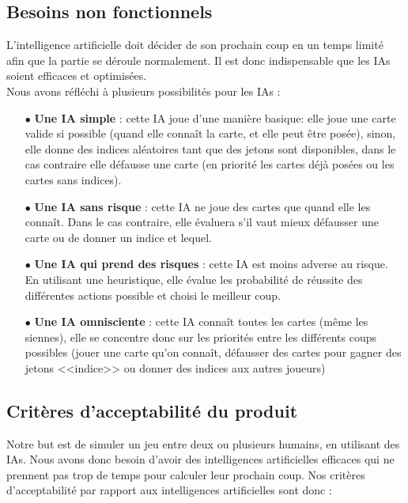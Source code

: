 \documentclass[11pt, letterpaper]{article}
\begin{document}
\subsection{Besoins non fonctionnels}

\noindent
L'intelligence artificielle doit décider de son prochain coup en un temps limité afin que la partie se déroule normalement. Il est donc indispensable que les IAs soient efficaces et optimisées. \\

\noindent
Nous avons réfléchi à plusieurs possibilités pour les IAs :\\

\begin{itemize}
    \item[$\bullet$] {\bfseries Une IA simple} : cette IA joue d'une manière basique: elle joue une carte valide si possible (quand elle connaît la carte, et elle peut être posée), sinon, elle donne des indices aléatoires tant que des jetons sont disponibles, dans le cas contraire elle défausse une carte (en priorité les cartes déjà posées ou les cartes sans indices).\\
    \item[$\bullet$] {\bfseries Une IA sans risque} : cette IA ne joue des cartes que quand elle les connaît. Dans le cas contraire, elle évaluera s'il vaut mieux défausser une carte ou de donner un indice et lequel.\\
    \item[$\bullet$] {\bfseries Une IA qui prend des risques} : cette IA est moins adverse au risque. En utilisant une heuristique, elle évalue les probabilité de réussite des différentes actions possible et choisi le meilleur coup. \\
    \item[$\bullet$] {\bfseries Une IA omnisciente} : cette IA connaît toutes les cartes (même les siennes), elle se concentre donc sur les priorités entre les différents coups possibles (jouer une carte qu'on connaît, défausser des cartes pour gagner des jetons <<indice>> ou donner des indices aux autres joueurs) 
\end{itemize}


\subsection{Critères d'acceptabilité du produit}

\noindent
Notre but est de simuler un jeu entre deux ou plusieurs humains, en utilisant des IAs. Nous avons donc besoin d'avoir des intelligences artificielles efficaces qui ne prennent pas trop de temps pour calculer leur prochain coup. Nos critères d'acceptabilité par rapport aux intelligences artificielles sont donc :\\
\end{document}
